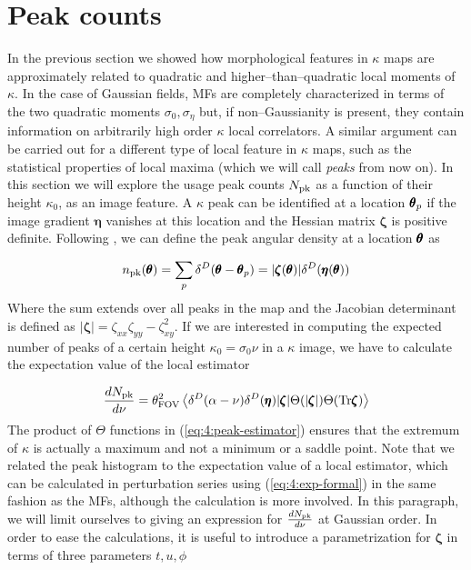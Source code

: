\section{Peak counts}
In the previous section we showed how morphological features in $\kappa$ maps are approximately related to quadratic and higher--than--quadratic local moments of $\kappa$. In the case of Gaussian fields, MFs are completely characterized in terms of the two quadratic moments $\sigma_0,\sigma_\eta$ but, if non--Gaussianity is present, they contain information on arbitrarily high order $\kappa$ local correlators. A similar argument can be carried out for a different type of local feature in $\kappa$ maps, such as the statistical properties of local maxima (which we will call \textit{peaks} from now on). In this section we will explore the usage peak counts $N_{\rm pk}$ as a function of their height $\kappa_0$, as an image feature. A $\kappa$ peak can be identified at a location $\pmb{\theta}_p$ if the image gradient $\pmb{\eta}$ vanishes at this location and the Hessian matrix $\pmb{\zeta}$ is positive definite. Following \citep{BondCMB}, we can define the peak angular density at a location $\pmb{\theta}$ as 

\begin{equation}
\label{eq:4:peak-density}
n_{\rm pk}(\pmb{\theta}) = \sum_p \delta^D(\pmb{\theta}-\pmb{\theta}_p) = \vert\pmb{\zeta}(\pmb{\theta})\vert\delta^D(\pmb{\eta}(\pmb{\theta}))
\end{equation}
%
Where the sum extends over all peaks in the map and the Jacobian determinant is defined as $\vert\pmb{\zeta}\vert=\zeta_{xx}\zeta_{yy}-\zeta_{xy}^2$. If we are interested in computing the expected number of peaks of a certain height $\kappa_0=\sigma_0\nu$ in a $\kappa$ image, we have to calculate the expectation value of the local estimator

\begin{equation}
\label{eq:4:peak-estimator}
\frac{dN_{\rm pk}}{d\nu} = \theta^2_{\rm FOV}\left\langle\delta^D(\alpha-\nu)\delta^D(\pmb{\eta})\vert\pmb{\zeta}\vert\Theta(\vert\pmb{\zeta}\vert)\Theta({\rm Tr}\pmb{\zeta})\right\rangle
\end{equation}
%
The product of $\Theta$ functions in (\ref{eq:4:peak-estimator}) ensures that the extremum of $\kappa$ is actually a maximum and not a minimum or a saddle point. Note that we related the peak histogram to the expectation value of a local estimator, which can be calculated in perturbation series using (\ref{eq:4:exp-formal}) in the same fashion as the MFs, although the calculation is more involved. In this paragraph, we will limit ourselves to giving an expression for $\frac{dN_{\rm pk}}{d\nu}$ at Gaussian order. In order to ease the calculations, it is useful to introduce a parametrization for $\pmb{\zeta}$ in terms of three parameters $t,u,\phi$

